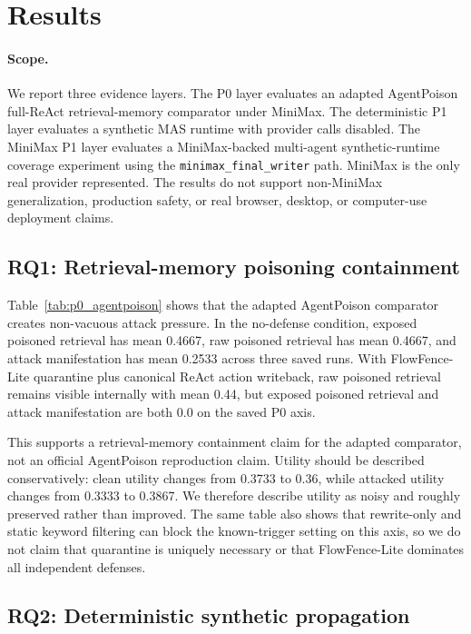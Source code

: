 \section{Results}

\paragraph{Scope.}
We report three evidence layers. The P0 layer evaluates an adapted AgentPoison full-ReAct retrieval-memory comparator under MiniMax. The deterministic P1 layer evaluates a synthetic MAS runtime with provider calls disabled. The MiniMax P1 layer evaluates a MiniMax-backed multi-agent synthetic-runtime coverage experiment using the \texttt{minimax\_final\_writer} path. MiniMax is the only real provider represented. The results do not support non-MiniMax generalization, production safety, or real browser, desktop, or computer-use deployment claims.

\subsection{RQ1: Retrieval-memory poisoning containment}

Table~\ref{tab:p0_agentpoison} shows that the adapted AgentPoison comparator creates non-vacuous attack pressure. In the no-defense condition, exposed poisoned retrieval has mean 0.4667, raw poisoned retrieval has mean 0.4667, and attack manifestation has mean 0.2533 across three saved runs. With FlowFence-Lite quarantine plus canonical ReAct action writeback, raw poisoned retrieval remains visible internally with mean 0.44, but exposed poisoned retrieval and attack manifestation are both 0.0 on the saved P0 axis.

This supports a retrieval-memory containment claim for the adapted comparator, not an official AgentPoison reproduction claim. Utility should be described conservatively: clean utility changes from 0.3733 to 0.36, while attacked utility changes from 0.3333 to 0.3867. We therefore describe utility as noisy and roughly preserved rather than improved. The same table also shows that rewrite-only and static keyword filtering can block the known-trigger setting on this axis, so we do not claim that quarantine is uniquely necessary or that FlowFence-Lite dominates all independent defenses.

\subsection{RQ2: Deterministic synthetic propagation}

